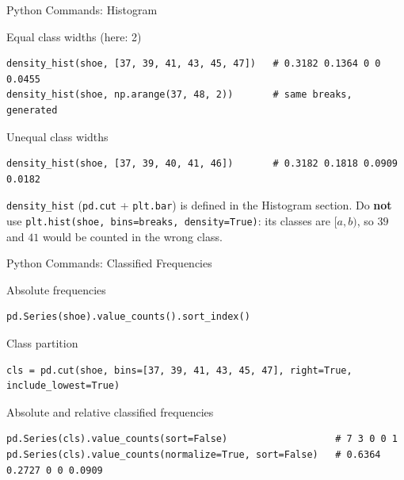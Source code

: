 \documentclass[aspectratio=169,11pt]{beamer}
\begin{document}
\begin{frame}[fragile]{Python Commands: Histogram}
  \begin{block}{Equal class widths (here: 2)}
    \begin{lstlisting}
density_hist(shoe, [37, 39, 41, 43, 45, 47])   # 0.3182 0.1364 0 0 0.0455
density_hist(shoe, np.arange(37, 48, 2))       # same breaks, generated
    \end{lstlisting}
  \end{block}
  \begin{block}{Unequal class widths}
    \begin{lstlisting}
density_hist(shoe, [37, 39, 40, 41, 46])       # 0.3182 0.1818 0.0909 0.0182
    \end{lstlisting}
  \end{block}
  \footnotesize \texttt{density\_hist} (\texttt{pd.cut} + \texttt{plt.bar}) is defined in the
  Histogram section. Do \textbf{not} use \texttt{plt.hist(shoe, bins=breaks, density=True)}:
  its classes are $[a,b)$, so $39$ and $41$ would be counted in the wrong class.
\end{frame}

\begin{frame}[fragile]{Python Commands: Classified Frequencies}
  \begin{block}{Absolute frequencies}
    \begin{lstlisting}
pd.Series(shoe).value_counts().sort_index()
    \end{lstlisting}
  \end{block}
  \begin{block}{Class partition}
    \begin{lstlisting}
cls = pd.cut(shoe, bins=[37, 39, 41, 43, 45, 47], right=True, include_lowest=True)
    \end{lstlisting}
  \end{block}
  \begin{block}{Absolute and relative classified frequencies}
    \begin{lstlisting}
pd.Series(cls).value_counts(sort=False)                   # 7 3 0 0 1
pd.Series(cls).value_counts(normalize=True, sort=False)   # 0.6364 0.2727 0 0 0.0909
    \end{lstlisting}
  \end{block}
\end{frame}
\end{document}
